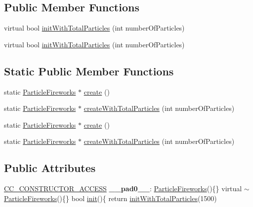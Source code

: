 \subsection*{Public Member Functions}
\begin{DoxyCompactItemize}
\item 
virtual bool \hyperlink{classParticleFireworks_a3f2126134f1932867e4160f984b973fe}{init\+With\+Total\+Particles} (int number\+Of\+Particles)
\item 
virtual bool \hyperlink{classParticleFireworks_aed2a65f083e9ec8fd2310e38914d3906}{init\+With\+Total\+Particles} (int number\+Of\+Particles)
\end{DoxyCompactItemize}
\subsection*{Static Public Member Functions}
\begin{DoxyCompactItemize}
\item 
static \hyperlink{classParticleFireworks}{Particle\+Fireworks} $\ast$ \hyperlink{classParticleFireworks_acc1b7500058526cbadec4baf3fb5d2ef}{create} ()
\item 
static \hyperlink{classParticleFireworks}{Particle\+Fireworks} $\ast$ \hyperlink{classParticleFireworks_a8523caae9d6974160c0742196919ffbf}{create\+With\+Total\+Particles} (int number\+Of\+Particles)
\item 
static \hyperlink{classParticleFireworks}{Particle\+Fireworks} $\ast$ \hyperlink{classParticleFireworks_a5df044193657794b3eadbc6e136fb1dd}{create} ()
\item 
static \hyperlink{classParticleFireworks}{Particle\+Fireworks} $\ast$ \hyperlink{classParticleFireworks_a1a28142b7f1415ef6607b32b3e4ae42b}{create\+With\+Total\+Particles} (int number\+Of\+Particles)
\end{DoxyCompactItemize}
\subsection*{Public Attributes}
\begin{DoxyCompactItemize}
\item 
\mbox{\label{classParticleFireworks_a3a2a7d2779ba071f33a86982a5eed4bd}} 
\hyperlink{_2cocos2d_2cocos_2base_2ccConfig_8h_a25ef1314f97c35a2ed3d029b0ead6da0}{C\+C\+\_\+\+C\+O\+N\+S\+T\+R\+U\+C\+T\+O\+R\+\_\+\+A\+C\+C\+E\+SS} {\bfseries \+\_\+\+\_\+pad0\+\_\+\+\_\+}\+: \hyperlink{classParticleFireworks}{Particle\+Fireworks}()\{\} virtual $\sim$\hyperlink{classParticleFireworks}{Particle\+Fireworks}()\{\} bool \hyperlink{classParticleSystem_a65c05b30432f6e8aeb45ba018f3a8d3f}{init}()\{ return \hyperlink{classParticleFireworks_a3f2126134f1932867e4160f984b973fe}{init\+With\+Total\+Particles}(1500)
\end{DoxyCompactItemize}
